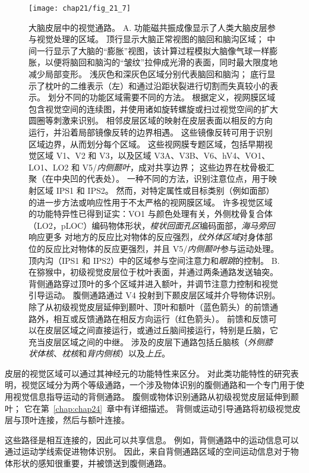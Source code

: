 \begin{figure}[htbp]
	\centering
	\texttt{[image: chap21/fig\_21\_7]}
	\caption{大脑皮层中的视觉通路。
		A. 功能磁共振成像显示了人类大脑皮层参与视觉处理的区域。
		顶行显示大脑正常视图的脑回和脑沟区域；
		中间一行显示了大脑的“膨胀”视图，该计算过程模拟大脑像气球一样膨胀，以便将脑回和脑沟的“皱纹”拉伸成光滑的表面，同时最大限度地减少局部变形。
		浅灰色和深灰色区域分别代表脑回和脑沟；
        底行显示了枕叶的二维表示（左）和通过沿距状裂进行切割而失真较小的表示。
		划分不同的功能区域需要不同的方法。
		根据定义，视网膜区域包含视觉空间的连续图，并使用诸如旋转螺旋或扫过视觉空间的扩大圆圈等刺激来识别。
		相邻皮层区域的映射在皮层表面以相反的方向运行，并沿着局部镜像反转的边界相遇。
		这些镜像反转可用于识别区域边界，从而划分每个区域。
		这些视网膜专题区域，包括早期视觉区域 V1、V2 和 V3，以及区域 V3A、V3B、V6、hV4、VO1、LO1、LO2 和 V5/\textit{内侧颞叶}，成对共享边界； 这些边界在枕骨极汇聚（在中央凹的代表处）。
		一种不同的方法，识别注意位点，用于映射区域 IPS1 和 IPS2。
		然而，对特定属性或目标类别（例如面部）的进一步方法或响应性用于不太严格的视网膜区域。
		许多视觉区域的功能特异性已得到证实：VO1 与颜色处理有关，外侧枕骨复合体（LO2，pLOC）编码物体形状，\textit{梭状回面孔区}编码面部，\textit{海马旁回}响应更多 对地方的反应比对物体的反应强烈，\textit{纹外体区域}对身体部位的反应比对物体的反应更强烈，并且 V5/\textit{内侧颞叶}参与运动处理。
		顶内沟（IPS1 和 IPS2）中的区域参与空间注意力和\textit{眼跳}的控制。
		B. 在猕猴中，初级视觉皮层位于枕叶表面，并通过两条通路发送轴突。
		背侧通路穿过顶叶的多个区域并进入额叶，并调节注意力控制和视觉引导运动。
		腹侧通路通过 V4 投射到下颞皮层区域并介导物体识别。
		除了从初级视觉皮层延伸到颞叶、顶叶和额叶（蓝色箭头）的前馈通路外，相互或反馈通路在相反方向运行（红色箭头）。
		前馈和反馈可以在皮层区域之间直接运行，或通过丘脑间接运行，特别是丘脑，它充当皮层区域之间的中继。 
		涉及的皮层下通路包括丘脑核（\textit{外侧膝状体核}、\textit{枕核}和\textit{背内侧核}）以及\textit{上丘}。}
	\label{fig:21_7}
\end{figure}


皮层的视觉区域可以通过其神经元的功能特性来区分。
对此类功能特性的研究表明，视觉区域分为两个等级通路，一个涉及物体识别的腹侧通路和一个专门用于使用视觉信息指导运动的背侧通路。
腹侧或物体识别通路从初级视觉皮层延伸到颞叶；
它在第~\ref{chap:chap24}~章中有详细描述。
背侧或运动引导通路将初级视觉皮层与顶叶连接，然后与额叶连接。


这些路径是相互连接的，因此可以共享信息。
例如，背侧通路中的运动信息可以通过运动学线索促进物体识别。
因此，来自背侧通路区域的空间运动信息对于物体形状的感知很重要，并被馈送到腹侧通路。


